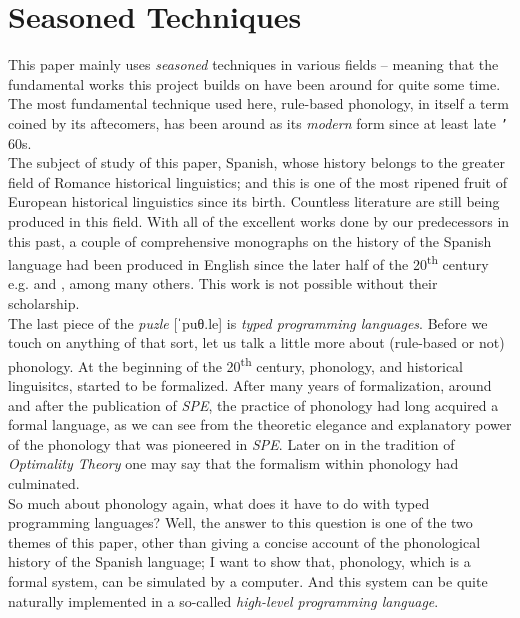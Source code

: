 \documentclass{report}[12pt]
\begin{document}
\section*{Seasoned Techniques}

This paper mainly uses \emph{seasoned} techniques in various fields -- meaning that the fundamental works this project builds on have been around for quite some time. \\ The most fundamental technique used here, rule-based phonology, in itself a term coined by its aftecomers, has been around as its \emph{modern} form since at least late \texttt{'}\kern-1pt 60s. \\
The subject of study of this paper, Spanish, whose history belongs to the greater field of Romance historical linguistics; and this is one of the most ripened fruit of European historical linguistics since its birth. Countless literature are still being produced in this field. With all of the excellent works done by our predecessors in this past, a couple of comprehensive monographs on the history of the Spanish language had been produced in English since the later half of the 20\textsuperscript{th} century e.g. \cite{penny_spanish} and \cite{lloyd_spanish}, among many others. This work is not possible without their scholarship. \\
The last piece of the \emph{puzle} [ˈpuθ.le] is \emph{typed programming languages}. Before we touch on anything of that sort, let us talk a little more about (rule-based or not) phonology. At the beginning of the 20\textsuperscript{th} century, phonology, and historical linguisitcs, started to be formalized. After many years of formalization, around and after the publication of \emph{SPE}, the practice of phonology had long acquired a formal language, as we can see from the theoretic elegance and explanatory power of the phonology that was pioneered in \emph{SPE}. Later on in the tradition of \emph{Optimality Theory} \cite{prince_smol_ot} one may say that the formalism within phonology had culminated. \\
So much about phonology again, what does it have to do with typed programming languages? Well, the answer to this question is one of the two themes of this paper, other than giving a concise account of the phonological history of the Spanish language; I want to show that, phonology, which is a formal system, can be simulated by a computer. And this system can be quite naturally implemented in a so-called \emph{high-level programming language}.
\end{document}
